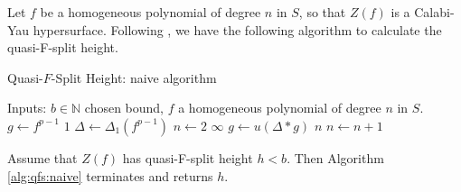 Let \(f\) be a homogeneous polynomial of degree \(n\) 
in \(S\), 
so that \(Z(f)\) is a Calabi-Yau hypersurface.
Following \cite{kty-2022-fedder}, we have the following
algorithm to calculate the quasi-F-split height.

\begin{algorithm}[H]
\caption{Quasi-\(F\)-Split Height: naive algorithm}
\label{alg:qfs:naive}
\begin{algorithmic}[1]
\State Inputs: \(b \in \mathbb{N}\) chosen bound, \(f\) a homogeneous
	polynomial of degree \(n\) in \(S\).
\State \(g \gets f^{p-1}\) 
    \State \Return \(1\) 
\EndIf
\State \(\Delta \gets \Delta_{1}(f^{p-1})\) 
\State \(n \gets 2\) 
        \State \Return \(\infty\)
    \EndIf
    \State \(g \gets u(\Delta * g)\) 
        \State \Return \(n\) 
    \EndIf
    \State \(n \gets n + 1\)
\EndWhile
\end{algorithmic}
\end{algorithm}

%

\begin{thm}
	Assume that
	\(Z(f)\) has quasi-F-split height \(h < b\).
	Then Algorithm \ref{alg:qfs:naive} terminates
	and returns \(h\).
\end{thm}

